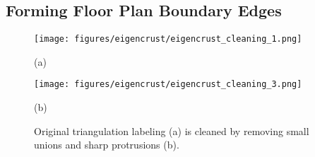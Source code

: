 \documentclass[10pt,twocolumn,letterpaper]{article}
\begin{document}


\subsection{Forming Floor Plan Boundary Edges}
\label{sec:boundary}

\begin{figure}[t]

\begin{minipage}[b]{0.49\linewidth}
  \centering
  \centerline{\texttt{[image: figures/eigencrust/eigencrust\_cleaning\_1.png]}}
  \centerline{(a)}
\end{minipage}
\hfill
\begin{minipage}[b]{0.49\linewidth}
  \centering
  \centerline{\texttt{[image: figures/eigencrust/eigencrust\_cleaning\_3.png]}}
  \centerline{(b)}
\end{minipage}

\caption{Original triangulation labeling (a) is cleaned by removing small unions and sharp protrusions (b).}
\label{fig:eigencrust_postprocessing}

\end{figure}
\end{document}
